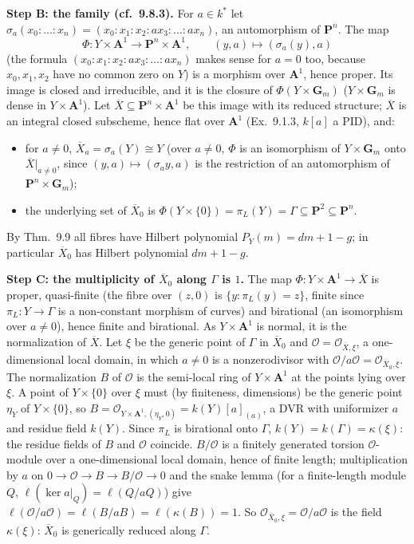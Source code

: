 \documentclass[11pt]{article}
\begin{document}
\textbf{Step B: the family (cf.\ 9.8.3).} For $a\in k^*$ let $\sigma_a(x_0:\dots:x_n)=(x_0:x_1:x_2:ax_3:\dots:ax_n)$, an automorphism of $\mathbf P^n$. The map
\[
\Phi:Y\times\mathbf A^1\to\mathbf P^n\times\mathbf A^1,\qquad(y,a)\mapsto(\sigma_a(y),a)
\]
(the formula $(x_0:x_1:x_2:ax_3:\dots:ax_n)$ makes sense for $a=0$ too, because $x_0,x_1,x_2$ have no common zero on $Y$) is a morphism over $\mathbf A^1$, hence proper. Its image is closed and irreducible, and it is the closure of $\Phi(Y\times\mathbf G_m)$ ($Y\times\mathbf G_m$ is dense in $Y\times\mathbf A^1$). Let $\overline X\subseteq\mathbf P^n\times\mathbf A^1$ be this image with its reduced structure; $\overline X$ is an integral closed subscheme, hence flat over $\mathbf A^1$ (Ex.~9.1.3, $k[a]$ a PID), and:
\begin{itemize}
\item for $a\ne0$, $\overline X_a=\sigma_a(Y)\cong Y$ (over $a\ne0$, $\Phi$ is an isomorphism of $Y\times\mathbf G_m$ onto $\overline X|_{a\ne0}$, since $(y,a)\mapsto(\sigma_a y,a)$ is the restriction of an automorphism of $\mathbf P^n\times\mathbf G_m$);
\item the underlying set of $\overline X_0$ is $\Phi(Y\times\{0\})=\pi_L(Y)=\Gamma\subseteq\mathbf P^2\subseteq\mathbf P^n$.
\end{itemize}
By Thm.~9.9 all fibres have Hilbert polynomial $P_Y(m)=dm+1-g$; in particular $\overline X_0$ has Hilbert polynomial $dm+1-g$.

\textbf{Step C: the multiplicity of $\overline X_0$ along $\Gamma$ is $1$.} The map $\Phi:Y\times\mathbf A^1\to\overline X$ is proper, quasi-finite (the fibre over $(z,0)$ is $\{y:\pi_L(y)=z\}$, finite since $\pi_L:Y\to\Gamma$ is a non-constant morphism of curves) and birational (an isomorphism over $a\ne0$), hence finite and birational. As $Y\times\mathbf A^1$ is normal, it is the normalization of $\overline X$. Let $\xi$ be the generic point of $\Gamma$ in $\overline X_0$ and $\mathcal O=\mathcal O_{\overline X,\xi}$, a one-dimensional local domain, in which $a\ne0$ is a nonzerodivisor with $\mathcal O/a\mathcal O=\mathcal O_{\overline X_0,\xi}$. The normalization $B$ of $\mathcal O$ is the semi-local ring of $Y\times\mathbf A^1$ at the points lying over $\xi$. A point of $Y\times\{0\}$ over $\xi$ must (by finiteness, dimensions) be the generic point $\eta_Y$ of $Y\times\{0\}$, so $B=\mathcal O_{Y\times\mathbf A^1,(\eta_Y,0)}=k(Y)[a]_{(a)}$, a DVR with uniformizer $a$ and residue field $k(Y)$. Since $\pi_L$ is birational onto $\Gamma$, $k(Y)=k(\Gamma)=\kappa(\xi)$: the residue fields of $B$ and $\mathcal O$ coincide. $B/\mathcal O$ is a finitely generated torsion $\mathcal O$-module over a one-dimensional local domain, hence of finite length; multiplication by $a$ on $0\to\mathcal O\to B\to B/\mathcal O\to0$ and the snake lemma (for a finite-length module $Q$, $\ell(\ker a|_Q)=\ell(Q/aQ)$) give $\ell(\mathcal O/a\mathcal O)=\ell(B/aB)=\ell(\kappa(B))=1$. So $\mathcal O_{\overline X_0,\xi}=\mathcal O/a\mathcal O$ is the field $\kappa(\xi)$: $\overline X_0$ is generically reduced along $\Gamma$.
\end{document}
